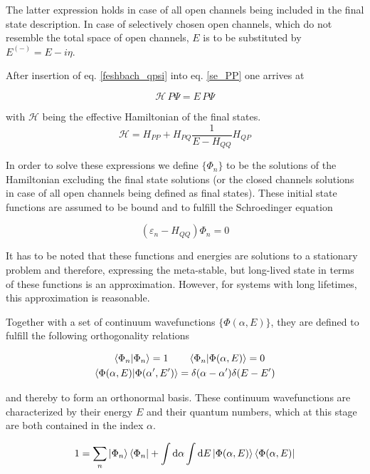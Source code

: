 The latter expression holds in case of all open channels being included
in the final state description.
In case of selectively chosen open channels, which do not resemble the total
space of open channels,
$E$ is to be substituted by $E^{(-)}=E - i\eta$.

After insertion of eq. \ref{feshbach_qpsi} into eq. \ref{se_PP} one arrives at

\begin{equation}
  \mathscr{H} \,P \Psi = E \,P \Psi \label{se_ppsi}
\end{equation}

with $\mathscr{H}$ being the effective Hamiltonian of the final states.
\begin{equation}
  \mathscr{H} = H_{PP} + H_{PQ} \frac{1}{E-H_{QQ}} H_{QP}
\end{equation}

In order to solve these expressions we define $\{\Phi_n\}$ to be the solutions
of the Hamiltonian excluding the final state solutions (or the closed channels
solutions in case of all open channels being defined as final states).
These initial state functions are assumed to be bound and to fulfill the
Schroedinger equation

\begin{equation}
  (\varepsilon_n - H_{QQ}) \Phi_n = 0 
\end{equation}

It has to be noted that these functions and energies are solutions to a stationary
problem and therefore, expressing the meta-stable, but long-lived state
in terms of these functions is an approximation. However, for systems
with long lifetimes, this approximation is reasonable.

Together with a set of continuum wavefunctions $\{\Phi(\alpha,E)\}$, they are
defined to fulfill the following orthogonality relations

\begin{align}
  \braket{\Phi_n|\Phi_n} = 1 \quad  & \quad \braket{\Phi_n|\Phi(\alpha,E)} = 0\\
  \braket{\Phi(\alpha,E)|\Phi(\alpha',E')} & = \delta(\alpha-\alpha') \delta(E-E')
\end{align}

and thereby to form an orthonormal basis. These continuum wavefunctions
are characterized
by their energy $E$ and their quantum numbers, which at this stage are both
contained
in the index $\alpha$.

\begin{equation}
  1 = \sum\limits_n \ket{\Phi_n}\bra{\Phi_n} + \int \mathrm{d}\alpha \int \mathrm{d}E
      \ket{\Phi(\alpha,E)}\bra{\Phi(\alpha,E)} \label{feshbach_1}
\end{equation}

